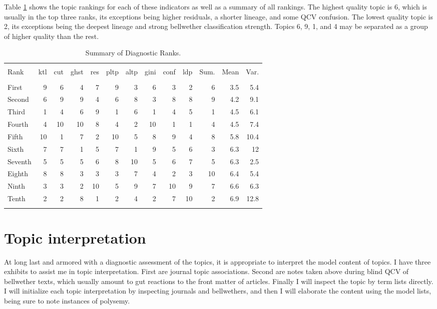 \documentclass[]{book}
\theoremstyle{definition}
\theoremstyle{definition}
\theoremstyle{definition}
\theoremstyle{remark}
\begin{document}
Table \ref{tab:sumrnk} shows the topic rankings for each of these
indicators as well as a summary of all rankings. The highest quality
topic is 6, which is usually in the top three ranks, its exceptions
being higher residuals, a shorter lineage, and some QCV confusion. The
lowest quality topic is 2, its exceptions being the deepest lineage and
strong bellwether classification strength. Topics 6, 9, 1, and 4 may be
separated as a group of higher quality than the rest.

\begin{table}[!htbp] \centering 
  \caption{Summary of Diagnostic Ranks.} 
  \label{tab:sumrnk} 
\small 
\begin{tabular}{@{\extracolsep{5pt}} lrrrrrrrrrrrr} 
\\[-1.8ex]\hline 
\hline \\[-1.8ex] 
Rank & ktl & cut & ghst & res & pltp & altp & gini & conf & ldp & Sum. & Mean & Var. \\ 
\hline \\[-1.8ex] 
First & 9 & 6 & 4 & 7 & 9 & 3 & 6 & 3 & 2 & 6 & 3.5 & 5.4 \\ 
Second & 6 & 9 & 9 & 4 & 6 & 8 & 3 & 8 & 8 & 9 & 4.2 & 9.1 \\ 
Third & 1 & 4 & 6 & 9 & 1 & 6 & 1 & 4 & 5 & 1 & 4.5 & 6.1 \\ 
Fourth & 4 & 10 & 10 & 8 & 4 & 2 & 10 & 1 & 1 & 4 & 4.5 & 7.4 \\ 
Fifth & 10 & 1 & 7 & 2 & 10 & 5 & 8 & 9 & 4 & 8 & 5.8 & 10.4 \\ 
Sixth & 7 & 7 & 1 & 5 & 7 & 1 & 9 & 5 & 6 & 3 & 6.3 & 12 \\ 
Seventh & 5 & 5 & 5 & 6 & 8 & 10 & 5 & 6 & 7 & 5 & 6.3 & 2.5 \\ 
Eighth & 8 & 8 & 3 & 3 & 3 & 7 & 4 & 2 & 3 & 10 & 6.4 & 5.4 \\ 
Ninth & 3 & 3 & 2 & 10 & 5 & 9 & 7 & 10 & 9 & 7 & 6.6 & 6.3 \\ 
Tenth & 2 & 2 & 8 & 1 & 2 & 4 & 2 & 7 & 10 & 2 & 6.9 & 12.8 \\ 
\hline \\[-1.8ex] 
\end{tabular} 
\end{table}

\hypertarget{topic-interpretation}{%
\section{Topic interpretation}\label{topic-interpretation}}

At long last and armored with a diagnostic assessment of the topics, it
is appropriate to interpret the model content of topics. I have three
exhibits to assist me in topic interpretation. First are journal topic
associations. Second are notes taken above during blind QCV of
bellwether texts, which usually amount to gut reactions to the front
matter of articles. Finally I will inspect the topic by term lists
directly. I will initialize each topic interpretation by inspecting
journals and bellwethers, and then I will elaborate the content using
the model lists, being sure to note instances of polysemy.
\end{document}
